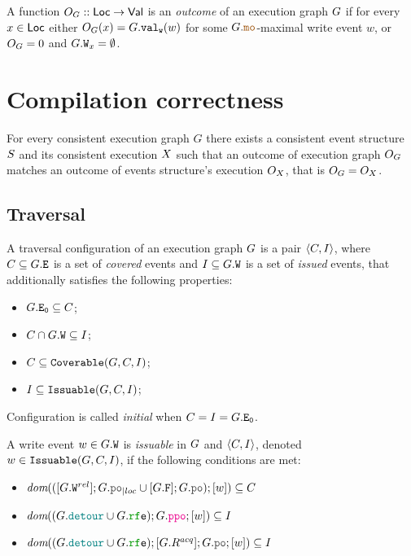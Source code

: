 \documentclass[12pt]{article}
\begin{document}
\begin{definition}
  A function $O_{G} :: \mathsf{Loc} \rightarrow \mathsf{Val}$ is an \emph{outcome} of an \imm execution graph $G$
  if for every $x \in \mathsf{Loc}$ either $O_{G}(x) = G.{\mathtt{val_w}}(w)$ 
  for some $\lG.\lMO$-maximal write event $w$, 
  or $O_{G} = 0$ and $G.{\mathtt{W}}_x = \emptyset$.
\end{definition}

\section{Compilation correctness}

\begin{theorem}
  For every consistent \imm execution graph $G$
  there exists a consistent event structure $S$ and its consistent execution $X$
  such that an outcome of execution graph $O_{G}$ matches
  an outcome of events structure's execution $O_{X}$, 
  that is $O_{G} = O_{X}$.
\end{theorem}

\subsection{Traversal}

\begin{definition}
  A traversal configuration of an execution graph $G$ is a pair $\langle C, I \rangle$, 
  where $C \subseteq G.{\mathtt{E}}$ is a set of \emph{covered} events 
  and $I \subseteq G.{\mathtt{W}}$ is a set of \emph{issued} events,
  that additionally satisfies the following properties:
  \begin{itemize}
    \item $G.{\mathtt{E_0}} \subseteq C$;
    \item $C \cap G.{\mathtt{W}} \subseteq I$;
    \item $C \subseteq {\mathtt{Coverable}}(G, C, I)$;
    \item $I \subseteq {\mathtt{Issuable}}(G, C, I)$;
  \end{itemize}
  Configuration is called \emph{initial} when $C = I = G.{\mathtt{E_0}}$.
\end{definition}

\begin{definition}
  A write event $w \in G.{\mathtt{W}}$ is \emph{issuable} in $G$ and $\langle C, I \rangle$,
  denoted $w \in {\mathtt{Issuable}}(G, C, I)$, 
  if the following conditions are met:
  \begin{itemize}
    \item $\dom{([\lG.\lW^{rel}];\lmakeLoc{\lG.\lPO} \cup [\lG.\lF];\lG.\lPO);[w]} \subseteq \lC$
    \item $\dom{(\lG.\lDETOUR \cup \lG.\lRFE);\lG.\lPPO;[w]} \subseteq \lI$
    \item $\dom{(\lG.\lDETOUR \cup \lG.\lRFE);[\lG.R^{acq}];\lG.\lPO;[w]} \subseteq \lI$
  \end{itemize}
\end{definition}
\end{document}
